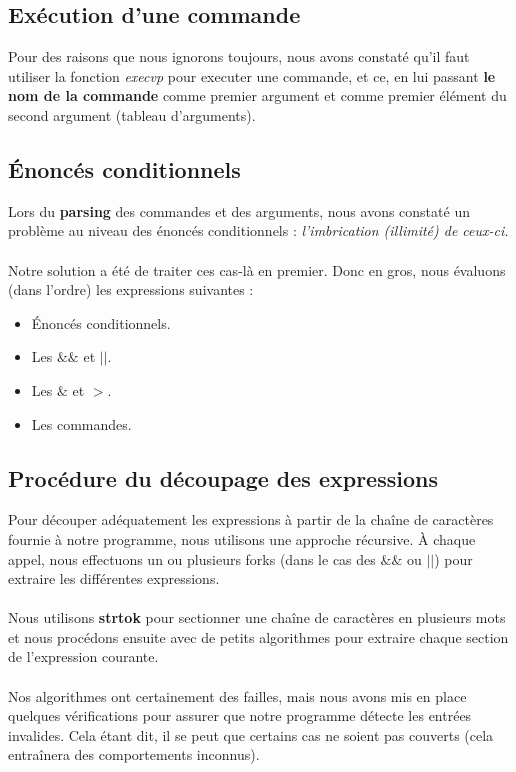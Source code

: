 \documentclass{article}
\begin{document}
\subsection{Exécution d'une commande}

Pour des raisons que nous ignorons toujours, nous avons constaté qu'il faut utiliser la fonction \emph{execvp} pour executer une commande, et ce, en lui passant \textbf{le nom de la commande} comme premier argument et comme premier élément du second argument (tableau d'arguments).

\subsection{Énoncés conditionnels}

Lors du \textbf{parsing} des commandes et des arguments, nous avons constaté un problème au niveau des énoncés conditionnels : \textit{l'imbrication (illimité) de ceux-ci.}
\\\\
Notre solution a été de traiter ces cas-là en premier. Donc en gros, nous évaluons (dans l’ordre) les expressions suivantes :

\begin{itemize}
    \item Énoncés conditionnels.
    \item Les $\&\&$ et $||$.
    \item Les $\&$ et $>$.
    \item Les commandes.
\end{itemize}

\subsection{Procédure du découpage des expressions}

Pour découper adéquatement les expressions à partir de la chaîne de caractères fournie à notre programme, nous utilisons une approche récursive. À chaque appel, nous effectuons un ou plusieurs forks (dans le cas des $\&\&$ ou $||$) pour extraire les différentes expressions.
\\\\
Nous utilisons \textbf{strtok} pour sectionner une chaîne de caractères en plusieurs mots et nous procédons ensuite avec de petits algorithmes pour extraire chaque section de l’expression courante.
\\\\
Nos algorithmes ont certainement des failles, mais nous avons mis en place quelques vérifications pour assurer que notre programme détecte les entrées invalides. Cela étant dit, il se peut que certains cas ne soient pas couverts (cela entraînera des comportements inconnus).
\end{document}
